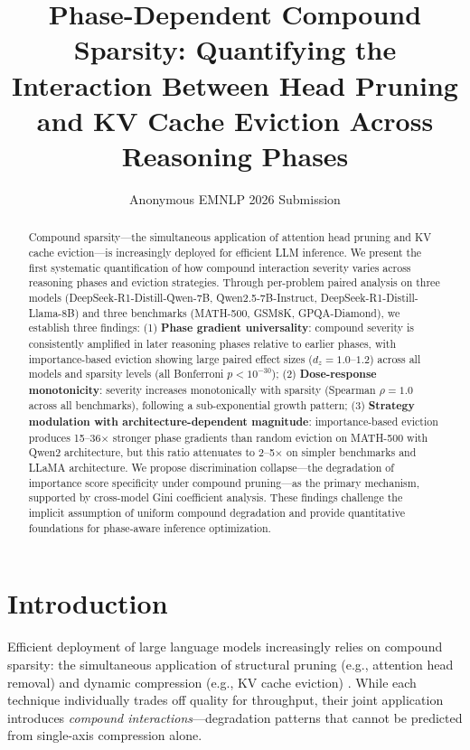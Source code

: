 \documentclass[11pt,a4paper]{article}
\title{Phase-Dependent Compound Sparsity: Quantifying the Interaction Between Head Pruning and KV Cache Eviction Across Reasoning Phases}
\author{Anonymous EMNLP 2026 Submission}
\begin{document}
\maketitle

\begin{abstract}
Compound sparsity---the simultaneous application of attention head pruning and KV cache eviction---is increasingly deployed for efficient LLM inference. We present the first systematic quantification of how compound interaction severity varies across reasoning phases and eviction strategies. Through per-problem paired analysis on three models (DeepSeek-R1-Distill-Qwen-7B, Qwen2.5-7B-Instruct, DeepSeek-R1-Distill-Llama-8B) and three benchmarks (MATH-500, GSM8K, GPQA-Diamond), we establish three findings: (1) \textbf{Phase gradient universality}: compound severity is consistently amplified in later reasoning phases relative to earlier phases, with importance-based eviction showing large paired effect sizes ($d_z = 1.0$--$1.2$) across all models and sparsity levels (all Bonferroni $p < 10^{-30}$); (2) \textbf{Dose-response monotonicity}: severity increases monotonically with sparsity (Spearman $\rho = 1.0$ across all benchmarks), following a sub-exponential growth pattern; (3) \textbf{Strategy modulation with architecture-dependent magnitude}: importance-based eviction produces 15--36$\times$ stronger phase gradients than random eviction on MATH-500 with Qwen2 architecture, but this ratio attenuates to 2--5$\times$ on simpler benchmarks and LLaMA architecture. We propose discrimination collapse---the degradation of importance score specificity under compound pruning---as the primary mechanism, supported by cross-model Gini coefficient analysis. These findings challenge the implicit assumption of uniform compound degradation and provide quantitative foundations for phase-aware inference optimization.
\end{abstract}

\section{Introduction}

Efficient deployment of large language models increasingly relies on compound sparsity: the simultaneous application of structural pruning (e.g., attention head removal) and dynamic compression (e.g., KV cache eviction) \cite{spark2024,adakv2024}. While each technique individually trades off quality for throughput, their joint application introduces \emph{compound interactions}---degradation patterns that cannot be predicted from single-axis compression alone.
\end{document}

